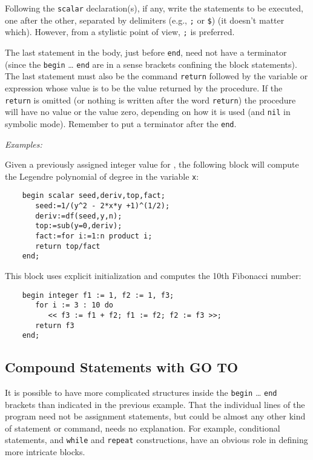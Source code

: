 Following the \texttt{scalar} declaration(s), if any, write the
statements to be executed, one after the other, separated by delimiters
(e.g., \texttt{;} or \texttt{\$}) (it doesn't matter which).  However, from a
stylistic point of view, \texttt{;} is preferred.

The last statement in the body, just before \texttt{end}, need not have a
terminator (since the \texttt{begin} \ldots{} \texttt{end} are in a sense brackets
confining the block statements).  The last statement must also be the
command \texttt{return} followed by the variable or
expression whose value is to be the value returned by the procedure.  If
the \texttt{return} is omitted (or nothing is written after the word
\texttt{return}) the procedure will have no value or the value zero, depending
on how it is used (and \texttt{nil} in symbolic mode).  Remember to put a
terminator after the \texttt{end}.

\textit{Examples:}

Given a previously assigned integer value for , the following block
will compute the Legendre polynomial of degree  in the variable
\texttt{x}:
\begin{verbatim}
    begin scalar seed,deriv,top,fact;
       seed:=1/(y^2 - 2*x*y +1)^(1/2);
       deriv:=df(seed,y,n);
       top:=sub(y=0,deriv);
       fact:=for i:=1:n product i;
       return top/fact
    end;
\end{verbatim}

This block uses explicit initialization and computes the 10th Fibonacci number:
\begin{verbatim}
    begin integer f1 := 1, f2 := 1, f3;
       for i := 3 : 10 do
          << f3 := f1 + f2; f1 := f2; f2 := f3 >>;
       return f3
    end;
\end{verbatim}

\subsection{Compound Statements with GO TO}

It is possible to have more complicated structures inside the \texttt{begin}
\ldots{} \texttt{end} brackets than indicated in the
previous example.  That the individual lines of the program need not be
assignment statements, but could be almost any other
kind of statement or command, needs no explanation.  For example,
conditional statements, and \texttt{while} and \texttt{repeat}
 constructions, have an obvious role in defining more
intricate blocks.


